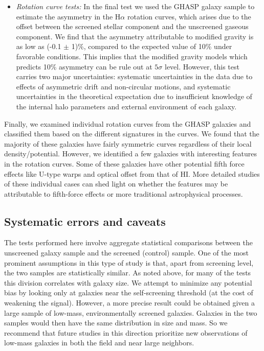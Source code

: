 \documentclass[useAMS,usenatbib,twocolumn]{mn2e}
\newcommand{\ha}{H$\alpha$}
\begin{document}
\begin{itemize}
\item {\it Rotation curve tests: }
In the final test we used the GHASP galaxy sample to estimate
the asymmetry in the \ha{} rotation curves, which arises due to the
offset between the screened stellar component and the unscreened gaseous
component. We find that the asymmetry attributable to modified gravity is as
low as (-0.1 $\pm$ 1)\%, compared to the expected value of 10\% under
favorable conditions.
This implies that the modified gravity models which predicts 10\%
asymmetry can be rule out at $5 \sigma$ level. However, this test carries two
major uncertainties: systematic uncertainties in the data due to effects of
asymmetric drift and non-circular motions, and systematic uncertainties in
the theoretical expectation due to insufficient knowledge of the internal
halo parameters and external environment of each galaxy.
\end{itemize}

Finally, we examined individual rotation curves from the GHASP 
galaxies and classified them based on the different signatures 
in the curves. We found that the majority of these galaxies 
have fairly symmetric curves regardless
of their local density/potential. However, we identified a 
few galaxies with interesting features in the rotation curves.
Some of these galaxies have other potential fifth force effects
like U-type warps and optical offset from that of HI.
More detailed studies of these individual cases can shed light
on whether the features may be attributable to fifth-force effects or
more traditional astrophysical processes.


\subsection{Systematic errors and caveats}
\label{sec:caveat}
The  tests performed here involve aggregate statistical
comparisons between the unscreened galaxy sample and the screened (control) sample.
One of the most prominent assumptions in this type of study is that, apart
from screening level, the two samples are statistically similar.  As noted
above, for many of the tests this division correlates with galaxy size. 
We attempt to minimize any potential bias
by looking only at galaxies near the self-screening threshold (at the cost
of weakening the signal).  However,
a more precise result could be obtained given a large sample of low-mass,
environmentally screened galaxies.  Galaxies in the two samples would then
have the same distribution in size and mass. So we recommend that
future studies in this direction prioritize new observations of low-mass
galaxies in both the field and near large neighbors.
\end{document}
